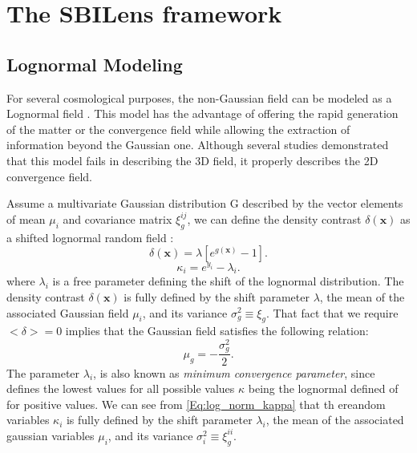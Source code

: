 \documentclass{aa}
\begin{document}
\section{The SBILens framework}
\subsection{Lognormal Modeling}
For several cosmological purposes, the non-Gaussian field can be modeled as a Lognormal field \citep{coles1991lognormal,bohm2017bayesian}.
This model has the advantage of offering the rapid generation of the matter or the convergence field while allowing the extraction of information beyond the Gaussian one. 
Although several studies demonstrated that this model fails in describing the 3D field, it properly describes the 2D convergence field.



Assume a multivariate Gaussian distribution G described by the vector elements of mean $\mu_i$ and covariance matrix $\xi_g^{ij}$, we can define the density contrast $\delta(\bm{x})$ as a shifted lognormal random field :
\begin{equation}
    \delta(\bm{x})=\lambda[e^{g(\bm{x})}-1]. 
\end{equation}\label{Eq:log_norm_kappa}
\begin{equation}\label{Eq:log_norm_kappa}
    \kappa_{i}=e^{y_i}-\lambda_i. 
\end{equation}
where $\lambda_i$ is a free parameter defining the shift of the lognormal distribution.  The density contrast $\delta(\bm{x})$ is fully defined by the shift parameter $\lambda$, the mean of the associated Gaussian field $\mu_i$, and its variance $\sigma_g^2\equiv \xi_g$. That fact that we require $<\delta>=0$ implies that the Gaussian field satisfies the following relation:
\begin{equation}
    \mu_g=-\frac{\sigma_g^2}{2}.
\end{equation}
The parameter $\lambda_i$, is also known as \textit{minimum convergence
parameter}, since defines the lowest values for all possible values $\kappa$ being the lognormal defined of for positive values. We can see from \autoref{Eq:log_norm_kappa} that th ereandom variables $\kappa_i$ is fully defined by the shift parameter $\lambda_i$, the mean of the associated gaussian variables $\mu_i$, and its variance $\sigma_i^2\equiv \xi_g^{ii}$. 
\end{document}
